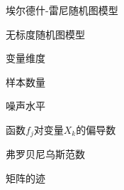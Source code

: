 \begin{denotation}
	\item[ER模型]        埃尔德什-雷尼随机图模型
	\item[SF模型]        无标度随机图模型
	\item[$d$]           变量维度
	\item[$n$]           样本数量
	\item[$\sigma$]      噪声水平
	
	\item[$\partial_{k}f_{j}$] 函数$f_{j}$对变量$X_{k}$的偏导数
	\item[$\|\cdot\|_{F}$] 弗罗贝尼乌斯范数
	\item[$tr(\cdot)$]   矩阵的迹
	
\end{denotation}
